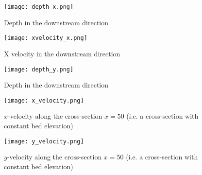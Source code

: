 \begin{figure}
\begin{center}
\texttt{[image: depth\_x.png]}
\caption{Depth in the downstream direction}
\label{fig:depthdownchan}
\end{center}
\end{figure}

\begin{figure}
\begin{center}
\texttt{[image: xvelocity\_x.png]}
\caption{X velocity in the downstream direction}
\label{fig:xveldownchan}
\end{center}
\end{figure}

\begin{figure}
\begin{center}
\texttt{[image: depth\_y.png]}
\caption{Depth in the downstream direction}
\label{fig:depthacrosschan}
\end{center}
\end{figure}
 

\begin{figure}
\begin{center}
\texttt{[image: x\_velocity.png]}
\caption{$x$-velocity along the cross-section $x=50$ (i.e. a cross-section with constant bed elevation)}
\label{fig:xvelscrosschan}
\end{center}
\end{figure}

\begin{figure}
\begin{center}
\texttt{[image: y\_velocity.png]}
\caption{$y$-velocity along the cross-section $x=50$ (i.e. a cross-section with constant bed elevation)}
\label{fig:yvelscroschan}
\end{center}
\end{figure}


\endinput

